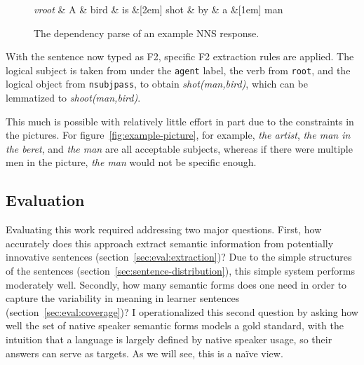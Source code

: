 \begin{figure}[htb!]
\begin{center}
    \begin{dependency}[arc edge,text only label,label style={above}]
    \begin{deptext}[column sep=.5em]
      \textit{vroot} \& A \& bird \& is \&[2em] shot \& by \& a \&[1em] man \\
    \end{deptext}
  \end{dependency}
\end{center}
\caption{The dependency parse of an example NNS response.}
\label{fig:F2-dependency}
\end{figure}

With the sentence now typed as F2, specific F2 extraction
rules are applied. The logical subject is taken from under the {\tt agent} label,
the verb from {\tt root}, and the logical object from {\tt nsubjpass},
to obtain \textit{shot(man,bird)}, which can be lemmatized to
\textit{shoot(man,bird)}. 

This much is possible with relatively little effort in part due to the constraints in the
pictures.  For figure~\ref{fig:example-picture}, for example,
\textit{the artist}, \textit{the man in the beret}, and \textit{the
  man} are all acceptable subjects, whereas if there were multiple men
in the picture, \textit{the man} would not be specific enough.

\subsection{Evaluation}
\label{sec:evaluation}

Evaluating this work required addressing two major questions.  First,
how accurately does this approach extract semantic information from potentially
innovative sentences (section~\ref{sec:eval:extraction})?  Due to the
simple structures of the sentences
(section~\ref{sec:sentence-distribution}), this simple system performs moderately well.
Secondly, how many semantic forms does one need in
order to capture the variability in meaning in learner sentences
(section~\ref{sec:eval:coverage})? I operationalized this second
question by asking how well the set of native speaker semantic forms
models a gold standard, with the intuition that a language is largely defined
by native speaker usage, so their answers can serve as targets.  As we
will see, this is a na\"ive view.
